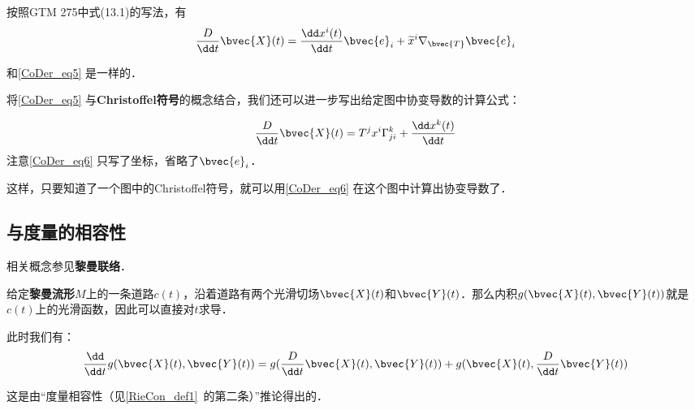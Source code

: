按照GTM 275中式(13.1)的写法，有
\begin{equation}
\frac{D}{\dd t}\bvec{X}(t)=\frac{\dd x^i(t)}{\dd t}\bvec{e}_i+\widetilde{x}^i\nabla_\bvec{T}\bvec{e}_i
\end{equation}

和\autoref{CoDer_eq5} 是一样的．

将\autoref{CoDer_eq5} 与\textbf{Christoffel符号}的概念结合，我们还可以进一步写出给定图中协变导数的计算公式：

\begin{equation}\label{CoDer_eq6}
\frac{D}{\dd t}\bvec{X}(t)=T^jx^i\Gamma^k_{ji}+\frac{\dd x^k(t)}{\dd t}
\end{equation}
注意\autoref{CoDer_eq6} 只写了坐标，省略了$\bvec{e}_i$．

这样，只要知道了一个图中的Christoffel符号，就可以用\autoref{CoDer_eq6} 在这个图中计算出协变导数了．

\subsection{与度量的相容性}

相关概念参见\textbf{黎曼联络}．

给定\textbf{黎曼流形}$M$上的一条道路$c(t)$，沿着道路有两个光滑切场${\bvec{X}}(t)$和${\bvec{Y}}(t)$．那么内积$g({\bvec{X}}(t), {\bvec{Y}}(t))$就是$c(t)$上的光滑函数，因此可以直接对$t$求导．

此时我们有：
\begin{equation}
\frac{\dd}{\dd t}g({\bvec{X}}(t), {\bvec{Y}}(t))=g(\frac{D}{\dd t}{\bvec{X}}(t), {\bvec{Y}}(t))+g({\bvec{X}}(t), \frac{D}{\dd t}{\bvec{Y}}(t))
\end{equation}

这是由“度量相容性（见\autoref{RieCon_def1}~的第二条）”推论得出的．










